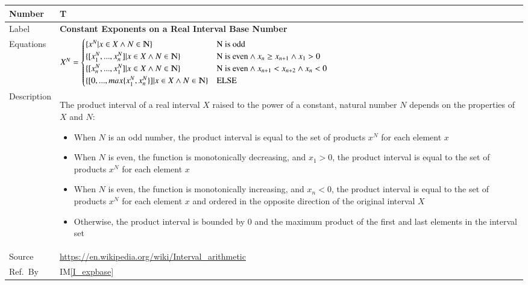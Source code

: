 \documentclass[12pt]{article}
\newcommand{\colAwidth}{0.13\textwidth}
\newcommand{\colBwidth}{0.82\textwidth}
\newcounter{theorynum} %
\newcommand{\iref}[1]{IM\ref{#1}}
\begin{document}
\noindent
\begin{minipage}{\textwidth}
	\renewcommand*{\arraystretch}{1.5}
	\begin{tabular}{| p{\colAwidth} | p{\colBwidth}|}
		\hline
		\rowcolor[gray]{0.9}
		Number& T{theorynum}\thetheorynum 
		\label{T_expbase}\\
		\hline
		Label&\bf Constant Exponents on a Real Interval Base 
		Number\\
		\hline
		Equations &  $X^N = \begin{cases}
			\{x^N | x \in X \wedge N 
			\in \varmathbb{N}\} & \text{N is odd}\\
			\{[x_{1}^N,...,x_{n}^N] | x \in X \wedge N 
			\in \varmathbb{N}\} & \text{N is even}\wedge x_{n} \geq x_{n+1} 
			\wedge x_{1} > 0\\
			\{[x_{n}^N,...,x_{1}^N] | x \in X \wedge N 
			\in \varmathbb{N}\} & \text{N is even} \wedge x_{n+1} < x_{n+2} 
			\wedge x_{n} < 0\\
			\{[0,...,max\{x_{1}^N,x_{n}^N\}] | x \in X \wedge N 
			\in \varmathbb{N}\} & \text{ELSE}\\
		\end{cases}$
		\newline
		\\
		\hline
		Description & The product interval of a real interval $X$ 
		raised to the power of a constant, natural number $N$ depends on the 
		properties of $X$ and $N$:
		\begin{itemize}
			\item When $N$ is an odd number, the product interval is equal to 
			the set of products $x^N$ for each element $x$
			\item When $N$ is even, the function is monotonically decreasing, 
			and $x_{1} > 0$, the product interval is equal to the set of 
			products $x^N$ for each element $x$
			\item When $N$ is even, the function is monotonically increasing, 
			and $x_{n} < 0$, the product interval is equal to the set of 
			products $x^N$ for each element $x$ and ordered in the opposite 
			direction of the original interval $X$
			\item Otherwise, the product interval is bounded by $0$ and the 
			maximum product of the first and last elements in the interval set
		\end{itemize}\\
		\hline
		Source & \url{https://en.wikipedia.org/wiki/Interval_arithmetic}\\
		\hline
		Ref.\ By & \iref{I_expbase}\\
		\hline
	\end{tabular}
\end{minipage}\\
\end{document}

